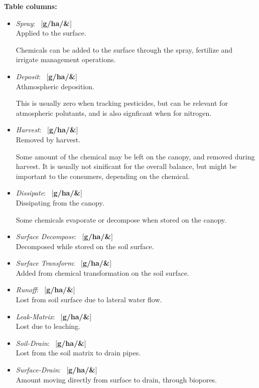 \documentclass[a4paper]{article}
\begin{document}
\textbf{Table columns:}\begin{itemize}
\item \textit{Spray}: ~$[$\textbf{g/ha/\&}$]$\\
Applied to the surface.

Chemicals can be added to the surface through the spray,
fertilize and irrigate management operations.
\item \textit{Deposit}: ~$[$\textbf{g/ha/\&}$]$\\
Athmospheric deposition.

This is usually zero when tracking pesticides, but can be
relevant for atmospheric polutants, and is also signficant when
for nitrogen.
\item \textit{Harvest}: ~$[$\textbf{g/ha/\&}$]$\\
Removed by harvest.

Some amount of the chemical may be left on the canopy, and
removed during harvest.  It is usually not sinificant for the
overall balance, but might be important to the consumers,
depending on the chemical.
\item \textit{Dissipate}: ~$[$\textbf{g/ha/\&}$]$\\
Dissipating from the canopy.

Some chemicals evaporate or decompose when stored on the canopy.
\item \textit{Surface Decompose}: ~$[$\textbf{g/ha/\&}$]$\\
Decomposed while stored on the soil surface.
\item \textit{Surface Transform}: ~$[$\textbf{g/ha/\&}$]$\\
Added from chemical transformation on the soil surface.
\item \textit{Runoff}: ~$[$\textbf{g/ha/\&}$]$\\
Lost from soil surface due to lateral water flow.
\item \textit{Leak-Matrix}: ~$[$\textbf{g/ha/\&}$]$\\
Lost due to leaching.
\item \textit{Soil-Drain}: ~$[$\textbf{g/ha/\&}$]$\\
Lost from the soil matrix to drain pipes.
\item \textit{Surface-Drain}: ~$[$\textbf{g/ha/\&}$]$\\
Amount moving directly from surface to drain, through biopores.


\end{itemize}
\end{document}
